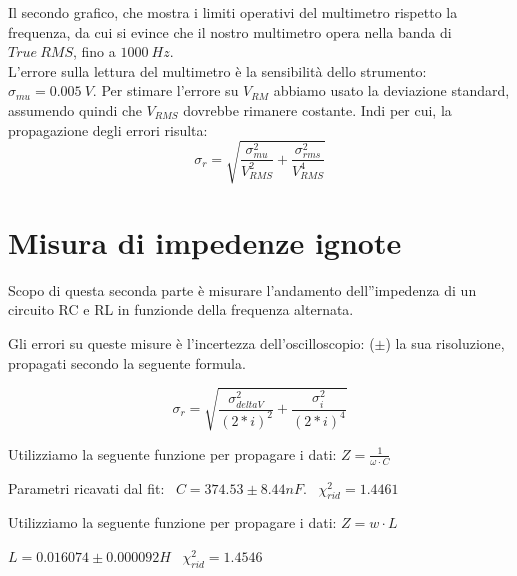 Il secondo grafico, che mostra i limiti operativi del multimetro rispetto la frequenza, da cui si evince che il nostro multimetro opera nella banda di $True\ RMS$, fino a  $1000\ Hz$.    \\
L'errore sulla lettura del multimetro è la sensibilità dello strumento: $\sigma_{mu} = 0.005\ V$. Per stimare l'errore su $V_{RM}$ abbiamo usato la deviazione standard, assumendo quindi che $V_{RMS}$ dovrebbe rimanere costante. 
Indi per cui, la propagazione degli errori risulta:
$$\sigma_r = \sqrt{\frac{\sigma_{mu}^2}{V_{RMS}^2} + \frac{\sigma_{rms}^2}{V_{RMS}^4}}$$

\begin{center}
\end{center}




%
%
%
%
%

\section{Misura di impedenze ignote}

Scopo di questa seconda parte è misurare l'andamento dell''impedenza di un circuito RC e RL in funzionde della frequenza alternata.

Gli errori su queste misure è l'incertezza dell'oscilloscopio: ($\pm$) la sua risoluzione, propagati secondo la seguente formula.

$$\sigma_r = \sqrt{\frac{\sigma_{deltaV}^2}{(2*i)^2} + \frac{\sigma_{i}^2}{(2*i)^4}}$$


Utilizziamo la seguente funzione per propagare i dati:
$Z = \frac{1}{\omega \cdot C}$

\begin{center}
\end{center}
Parametri ricavati dal fit:
\
$C = 374.53\pm 8.44 nF$.
\
$\chi_{rid}^2= 1.4461 $ 


Utilizziamo la seguente funzione per propagare i dati:
$Z = w\cdot L$

\begin{center}
\end{center}

$L = 0.016074\pm 0.000092 H$ \
$\chi_{rid}^2 = 1.4546$ 




